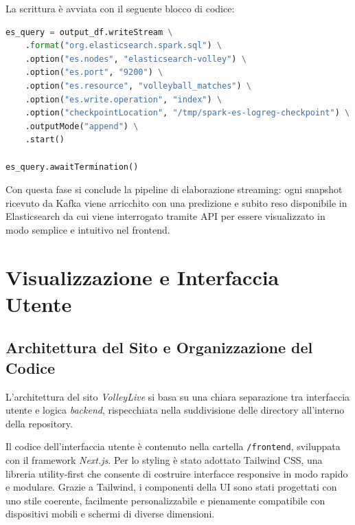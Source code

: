 \documentclass[a4paper,12pt]{report}
\begin{document}
\newpage

La scrittura è avviata con il seguente blocco di codice:

\begin{lstlisting}[language=Python]
es_query = output_df.writeStream \
    .format("org.elasticsearch.spark.sql") \
    .option("es.nodes", "elasticsearch-volley") \
    .option("es.port", "9200") \
    .option("es.resource", "volleyball_matches") \
    .option("es.write.operation", "index") \
    .option("checkpointLocation", "/tmp/spark-es-logreg-checkpoint") \
    .outputMode("append") \
    .start()

es_query.awaitTermination()
\end{lstlisting}

Con questa fase si conclude la pipeline di elaborazione streaming: ogni snapshot ricevuto da Kafka viene arricchito con una predizione e subito reso disponibile in Elasticsearch da cui viene interrogato tramite API per essere visualizzato in modo semplice e intuitivo nel frontend.





\chapter{Visualizzazione e Interfaccia Utente}

\section{Architettura del Sito e Organizzazione del Codice}

L’architettura del sito \textit{VolleyLive} si basa su una chiara separazione tra interfaccia utente e logica \textit{backend}, rispecchiata nella suddivisione delle directory all’interno della repository.

Il codice dell’interfaccia utente è contenuto nella cartella \texttt{/frontend}, sviluppata con il framework \textit{Next.js}.
Per lo styling è stato adottato Tailwind CSS, una libreria utility-first che consente di costruire interfacce responsive in modo rapido e modulare. Grazie a Tailwind, i componenti della UI sono stati progettati con uno stile coerente, facilmente personalizzabile e pienamente compatibile con dispositivi mobili e schermi di diverse dimensioni.
\end{document}
